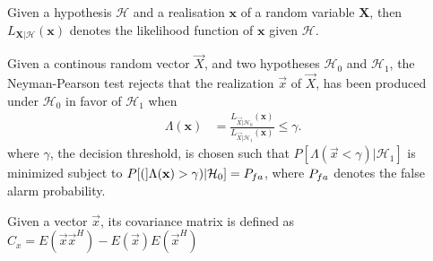 \documentclass[a4paper, openany, oneside]{memoir}
\begin{document}
\begin{blockDefinition}
Given a hypothesis $\mathcal{H}$ and a realisation $\mathbf{x}$ of a random variable $\mathbf{X}$, then $L_{\mathbf{X} | \mathcal{H}}(\mathbf{x})$ denotes the likelihood function of $\mathbf{x}$ given $\mathcal{H}$.
\end{blockDefinition}

\begin{blockDefinition}
Given a continous random vector $\vec{X}$, and two hypotheses $\mathcal{H}_0$ and $\mathcal{H}_1$, the Neyman-Pearson test rejects that the realization $\vec{x}$ of $\vec{X}$, has been produced under $\mathcal{H}_0$ in favor of $\mathcal{H}_1$
when
\begin{align*}
    \Lambda (\mathbf{x}) &= \frac{L_{\vec{X} | \mathcal{H}_0} (\mathbf{x})}{L_{\vec{X} | \mathcal{H}_1}(\mathbf{x})} \leq \gamma.
\end{align*}
where $\gamma$, the decision threshold, is chosen such that $P[\Lambda(\vec{x} < \gamma) | \mathcal{H}_1]$ is minimized subject to $P[(]\Lambda(\vec{x}) > \gamma) | \mathcal{H}_0] = P\ss{fa}$, where $P\ss{fa}$ denotes the false alarm probability. %
\end{blockDefinition}

\begin{blockDefinition}
Given a vector $\vec{x}$, its covariance matrix is defined as $C_{x} = E(\vec{x}\vec{x}^H)-E(\vec{x})E(\vec{x}^H)$
\end{blockDefinition}
\end{document}
